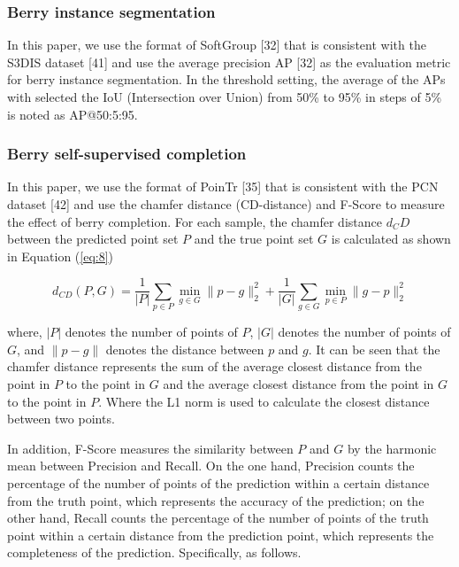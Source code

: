 \documentclass[12pt]{article}
\begin{document}
\subsubsection{Berry instance segmentation}

In this paper, we use the format of SoftGroup [32] that is consistent with the S3DIS dataset [41] and use the average precision AP [32] as the evaluation metric for berry instance segmentation. In the threshold setting, the average of the APs with selected the IoU (Intersection over Union) from 50\% to 95\% in steps of 5\% is noted as AP@50:5:95.

\subsubsection{Berry self-supervised completion}

In this paper, we use the format of PoinTr [35] that is consistent with the PCN dataset [42] and use the chamfer distance (CD-distance) and F-Score to measure the effect of berry completion. 
For each sample, the chamfer distance $d_CD$ between the predicted point set $P$ and the true point set $G$ is calculated as shown in Equation (\ref{eq:8})

\begin{equation}
    d_{CD}(P, G) = \frac{1}{|P|} \sum_{p \in P} \min_{g \in G} \|p - g\|_2^2 + \frac{1}{|G|} \sum_{g \in G} \min_{p \in P} \|g - p\|_2^2
    \label{eq:8}
\end{equation}

{\raggedright where, $|P|$ denotes the number of points of $P$, $|G|$ denotes the number of points of $G$, and $\|p - g\|$ denotes the distance between $p$ and $g$. 
It can be seen that the chamfer distance represents the sum of the average closest distance from the point in $P$ to the point in $G$ and the average closest distance from the point in $G$ to the point in $P$. Where the L1 norm is used to calculate the closest distance between two points.}

In addition, F-Score measures the similarity between $P$ and $G$ by the harmonic mean between Precision and Recall. 
On the one hand, Precision counts the percentage of the number of points of the prediction within a certain distance from the truth point, which represents the accuracy of the prediction;
on the other hand, Recall counts the percentage of the number of points of the truth point within a certain distance from the prediction point, which represents the completeness of the prediction. Specifically, as follows.
\end{document}
